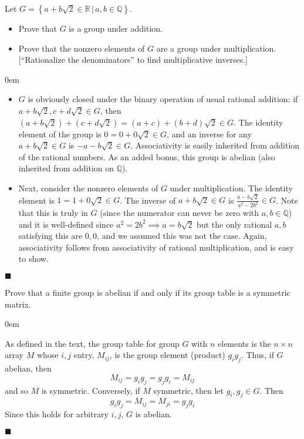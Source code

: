 \documentclass[12pt]{article}
\renewcommand{\qed}{\hfill$\blacksquare$}
\renewenvironment{proof}{\begin{addmargin}[1em]{0em}\begin{newproof}}{\end{newproof}\end{addmargin}\qed}
\newenvironment{problem}[2][Exercise]{\begin{trivlist}
\item[\hskip \labelsep {\bfseries #1}\hskip \labelsep {\bfseries #2.}]}{\end{trivlist}}
\begin{document}
\begin{problem}{1.1.9}
Let $G=\left\{a+b\sqrt{2}\in \mathbb{R} \, | \, a,b\in\mathbb{Q}\right\}$.
\begin{itemize}
    \item Prove that $G$ is a group under addition.
    \item Prove that the nonzero elements of $G$ are a group under multiplication. [``Rationalize the denominators'' to find multiplicative inverses.]
\end{itemize}
\end{problem}
\begin{proof}
\begin{itemize}
    \item $G$ is obviously closed under the binary operation of usual rational addition: if $a+b\sqrt{2},c+d\sqrt{2}\in G$, then $\left(a+b\sqrt{2}\right)+\left(c+d\sqrt{2}\right) = \left(a+c\right)+\left(b+d\right)\sqrt{2}\in G$. The identity element of the group is $0 = 0+0\sqrt{2} \in G$, and an inverse for any $a+b\sqrt{2}\in G$ is $-a-b\sqrt{2}\in G$. Associativity is easily inherited from addition of the rational numbers. As an added bonus, this group is abelian (also inherited from addition on $\mathbb{Q}$).
    \item Next, consider the nonzero elements of $G$ under multiplication. The identity element is $1=1+0\sqrt{2}\in G$. The inverse of $a+b\sqrt{2}\in G$ is $\frac{a-b\sqrt{2}}{a^2-2b^2} \in G$. Note that this is truly in $G$ (since the numerator can never be zero with $a,b\in \mathbb{Q}$) and it is well-defined since $a^2=2b^2 \implies a = b\sqrt{2}$ but the only rational $a,b$ satisfying this are $0,0$, and we assumed this was not the case. Again, associativity follows from associativity of rational multiplication, and is easy to show.
\end{itemize}
\end{proof}

\begin{problem}{1.1.10}
Prove that a finite group is abelian if and only if its group table is a symmetric matrix.
\end{problem}

\begin{proof}
As defined in the text, the group table for group $G$ with $n$ elements is the $n \times n$ array $M$ whose $i,j$ entry, $M_{ij}$, is the group element (product) $g_ig_j$. Thus, if $G$ abelian, then $$ M_{ij} = g_ig_j = g_jg_i = M_{ij}$$ and so $M$ is symmetric. Conversely, if $M$ symmetric, then let $g_i,g_j\in G$. Then $$ g_ig_j = M_{ij} = M_{ji}=g_jg_i$$ Since this holds for arbitrary $i,j$, $G$ is abelian.
\end{proof}
\end{document}
